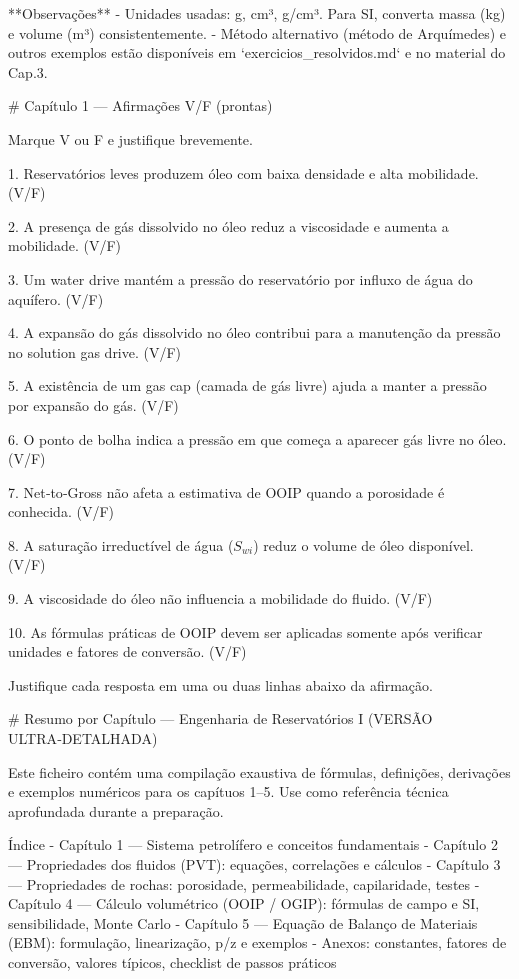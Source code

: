 \documentclass[11pt,a4paper]{article}
\begin{document}
**Observações**
- Unidades usadas: g, cm³, g/cm³. Para SI, converta massa (kg) e volume (m³) consistentemente.  
- Método alternativo (método de Arquímedes) e outros exemplos estão disponíveis em `exercicios_resolvidos.md` e no material do Cap.3.

# Capítulo 1 — Afirmações V/F (prontas)

Marque V ou F e justifique brevemente.

1. Reservatórios leves produzem óleo com baixa densidade e alta mobilidade. (V/F)

2. A presença de gás dissolvido no óleo reduz a viscosidade e aumenta a mobilidade. (V/F)

3. Um water drive mantém a pressão do reservatório por influxo de água do aquífero. (V/F)

4. A expansão do gás dissolvido no óleo contribui para a manutenção da pressão no solution gas drive. (V/F)

5. A existência de um gas cap (camada de gás livre) ajuda a manter a pressão por expansão do gás. (V/F)

6. O ponto de bolha indica a pressão em que começa a aparecer gás livre no óleo. (V/F)

7. Net‑to‑Gross não afeta a estimativa de OOIP quando a porosidade é conhecida. (V/F)

8. A saturação irreductível de água ($S_{wi}$) reduz o volume de óleo disponível. (V/F)

9. A viscosidade do óleo não influencia a mobilidade do fluido. (V/F)

10. As fórmulas práticas de OOIP devem ser aplicadas somente após verificar unidades e fatores de conversão. (V/F)


Justifique cada resposta em uma ou duas linhas abaixo da afirmação.

# Resumo por Capítulo — Engenharia de Reservatórios I (VERSÃO ULTRA‑DETALHADA)

Este ficheiro contém uma compilação exaustiva de fórmulas, definições, derivações e exemplos numéricos para os capítuos 1–5. Use como referência técnica aprofundada durante a preparação.

Índice
- Capítulo 1 — Sistema petrolífero e conceitos fundamentais
- Capítulo 2 — Propriedades dos fluidos (PVT): equações, correlações e cálculos
- Capítulo 3 — Propriedades de rochas: porosidade, permeabilidade, capilaridade, testes
- Capítulo 4 — Cálculo volumétrico (OOIP / OGIP): fórmulas de campo e SI, sensibilidade, Monte Carlo
- Capítulo 5 — Equação de Balanço de Materiais (EBM): formulação, linearização, p/z e exemplos
- Anexos: constantes, fatores de conversão, valores típicos, checklist de passos práticos
\end{document}
